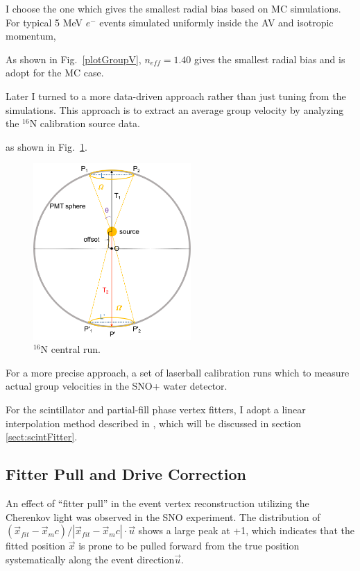 I choose the one which gives the smallest radial bias based on MC simulations. 
For typical 5 MeV $e^-$ events simulated uniformly inside the AV and isotropic momentum,  

As shown in Fig.~\ref{plotGroupV}, $n_{eff}=1.40$ gives the smallest radial bias and is adopt for the MC case.


Later I turned to a more data-driven approach rather than just tuning from the simulations. This approach is to extract an average group velocity by analyzing the $^{16}$N calibration source data.

as shown in Fig.~\ref{n16_groupVeloctiy}.

\begin{figure}[!htb]
	\centering
	\includegraphics[width=6cm]{n16_groupVelocity.png}
	\caption{$^{16}$N central run.}
	\label{n16_groupVeloctiy}
\end{figure}

For a more precise approach, a set of laserball calibration runs which  to measure actual group velocities in the SNO+ water detector\cite{groupVmeasure}. 
 
For the scintillator and partial-fill phase vertex fitters, I adopt a linear interpolation method described in \cite{coulter2013modelling}, which will be discussed in section \ref{sect:scintFitter}.

\subsection{Fitter Pull and Drive Correction}

An effect of ``fitter pull'' in the event vertex reconstruction utilizing the Cherenkov light was observed in the SNO experiment. The distribution of $(\vec{x}_{fit}-\vec{x}_mc)/|\vec{x}_{fit}-\vec{x}_mc|\cdot \vec{u}$ shows a large peak at +1, which indicates that the fitted position $\vec{x}$ is prone to be pulled forward from the true position systematically along the event direction$\vec{u}$\cite{driveCorPeter,brice1996monte,coulter2013modelling}. 

